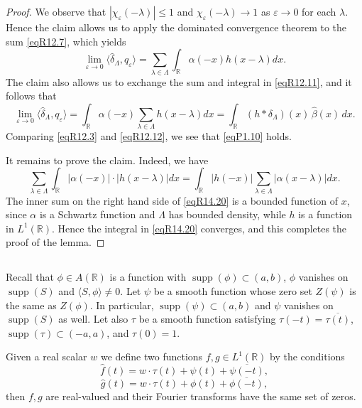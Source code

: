 \documentclass[reqno,a4paper,12pt]{amsart}
\numberwithin{equation}{section}
\numberwithin{figure}{section}
\newcommand\R{\mathbb{R}}
\newcommand\lam{\lambda}
\newcommand\Lam{\Lambda}
\newcommand\1{\mathds{1}}
\newcommand\eps{\varepsilon}
\renewcommand\leq{\leqslant}
\newcommand\sbt{\subset}
\newcommand{\ft}[1]{\widehat{#1}}
\newcommand{\dotprod}[2]{\langle #1 , #2 \rangle}
\newcommand{\supp}{\operatorname{supp}}
\newcommand{\zeros}{Z}
\theoremstyle{plain}
\theoremstyle{definition}
\begin{document}
\begin{proof}
We observe that $|\chi_\eps(-\lam)| \leq 1$ and
$\chi_\eps(-\lam) \to 1$ as $\eps \to 0$ for each $\lam$.
Hence the claim allows us to apply 
the  dominated convergence theorem
to the sum \eqref{eqR12.7}, which yields
\begin{equation}
  \label{eqR12.11}
\lim_{\eps \to 0} \dotprod{\ft{\delta}_\Lam}{q_\eps} 
= \sum_{\lambda\in\Lambda}  \int_{\mathbb R}\alpha(-x)  h(x-\lambda)dx.
\end{equation}
The claim also allows us to exchange the sum and integral in \eqref{eqR12.11},
and it follows that
\begin{equation}
  \label{eqR12.12}
\lim_{\eps \to 0} \dotprod{\ft{\delta}_\Lam}{q_\eps} 
= \int_{\mathbb R}\alpha(-x) \sum_{\lambda\in\Lambda} h(x-\lambda)dx
= \int_{\R} (h \ast \delta_\Lam)(x) \, \ft{\beta}(x) \, dx.
\end{equation}
Comparing \eqref{eqR12.3} and
\eqref{eqR12.12}, we see that
\eqref{eqP1.10} holds.


It remains to prove the claim. Indeed,  we have
\begin{equation}\label{eqR14.20}
\sum_{\lambda\in\Lambda} 
 \int_{\mathbb R}|\alpha(-x)|\cdot|h(x-\lambda)|dx
= \int_{\mathbb R}|h(-x)|
\sum_{\lambda\in\Lambda} 
|\alpha(x-\lambda)|dx.
\end{equation}
The inner sum on the right hand side of \eqref{eqR14.20}
 is a bounded function of $x$, since $\alpha$ is a 
Schwartz function and $\Lambda$ has bounded density, 
while $h$ is a function in $L^1(\mathbb R)$.
 Hence the integral in 
\eqref{eqR14.20} converges, and this completes the proof
of the lemma.
\end{proof}





\subsection{}
Recall that $\phi \in A(\R)$ is a function
with $\supp(\phi) \sbt (a,b)$,  
$\phi$ vanishes on $\supp(S)$ and 
 $\dotprod{S}{\phi} \neq 0$.
Let $\psi$ be a smooth function
whose zero set   $\zeros(\psi)$ is the same
as $\zeros(\phi)$. In particular, 
$\supp(\psi) \sbt (a,b)$ and
$\psi$ vanishes on $\supp(S)$ as well.
Let also $\tau$ be a smooth
function satisfying
$ \tau(-t) = \overline{ \tau(t)}$,
$\supp(\tau) \sbt (-a,a)$,
and $\tau(0)=1$.

Given a real scalar $w$ we define two functions 
$f, g \in L^1(\mathbb{R})$ by the conditions
 \begin{equation}
\label{eqR14.2}
\ft{f}(t) = w \cdot \tau(t) + \psi(t) + \overline{\psi(-t)},
 \end{equation}
 \begin{equation}
\label{eqR14.3}
\ft{g}(t) = w \cdot \tau(t) + \phi(t) + \overline{\phi(-t)},
 \end{equation}
then $f,g$ are real-valued and their
Fourier transforms have the same set of zeros.
\end{document}
